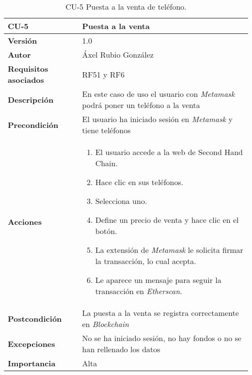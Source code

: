 \begin{table}[p]
	\centering
	\begin{tabularx}{\linewidth}{ p{} p{} }
		\toprule
		\textbf{CU-5}    & \textbf{Puesta a la venta}\\
		\toprule
		\textbf{Versión}              & 1.0    \\
		\textbf{Autor}                & Áxel Rubio González \\
		\textbf{Requisitos asociados} & RF51 y RF6 \\
		\textbf{Descripción}          & En este caso de uso el usuario con \textit{Metamask} podrá poner un teléfono a la venta  \\
		\textbf{Precondición}         & El usuario ha iniciado sesión en \textit{Metamask} y tiene teléfonos \\
		\textbf{Acciones}             &
		\begin{enumerate}
			\def\labelenumi{\arabic{enumi}.}
			\tightlist
			\item El usuario accede a la web de Second Hand Chain.
			\item Hace clic en sus teléfonos.
                \item Selecciona uno.
                \item Define un precio de venta y hace clic en el botón.
                \item La extensión de \textit{Metamask} le solicita firmar la transacción, lo cual acepta.
                \item Le aparece un mensaje para seguir la transacción en \textit{Etherscan}.
		\end{enumerate}\\
		\textbf{Postcondición}        & La puesta a la venta se registra correctamente en \textit{Blockchain} \\
		\textbf{Excepciones}          & No se ha iniciado sesión, no hay fondos o no se han rellenado los datos \\
		\textbf{Importancia}          & Alta \\
		\bottomrule
	\end{tabularx}
	\caption{CU-5 Puesta a la venta de teléfono.}
\end{table}

